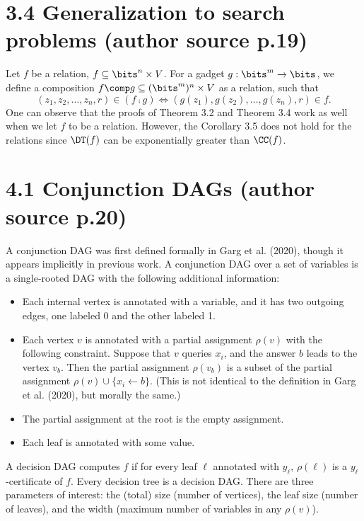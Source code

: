 \section*{3.4 Generalization to search problems (author source p.19)}
Let $f$ be a relation, $f\subseteq\bits^n\times V$. For a gadget $g:\bits^m\to\bits$, we define a composition $f\comp g\subseteq(\bits^m)^n\times V$ as a relation, such that
\[(z_1,z_2,\ldots,z_n,r)\in(f\comp g)\iff(g(z_1),g(z_2),\ldots,g(z_n),r)\in f.\]
One can observe that the proofs of Theorem 3.2 and Theorem 3.4 work as well when we let $f$ to be a relation. However, the Corollary 3.5 does not hold for the relations since $\DT(f)$ can be exponentially greater than $\CC(f)$.
\section*{4.1 Conjunction DAGs (author source p.20)}
A conjunction DAG was first defined formally in Garg et al. (2020), though it appears implicitly in previous work. A conjunction DAG over a set of variables is a single-rooted DAG with the following additional information:
\begin{itemize}
\item Each internal vertex is annotated with a variable, and it has two outgoing edges, one labeled 0 and the other labeled 1.
\item Each vertex $v$ is annotated with a partial assignment $\rho(v)$ with the following constraint. Suppose that $v$ queries $x_i$, and the answer $b$ leads to the vertex $v_b$. Then the partial assignment $\rho(v_b)$ is a subset of the partial assignment $\rho(v)\cup\{x_i\leftarrow b\}$. (This is not identical to the definition in Garg et al. (2020), but morally the same.)
\item The partial assignment at the root is the empty assignment.
\item Each leaf is annotated with some value.
\end{itemize}
A decision DAG computes $f$ if for every leaf $\ell$ annotated with $y_\ell$, $\rho(\ell)$ is a $y_\ell$-certificate of $f$.
Every decision tree is a decision DAG. There are three parameters of interest: the (total) size (number of vertices), the leaf size (number of leaves), and the width (maximum number of variables in any $\rho(v)$).
